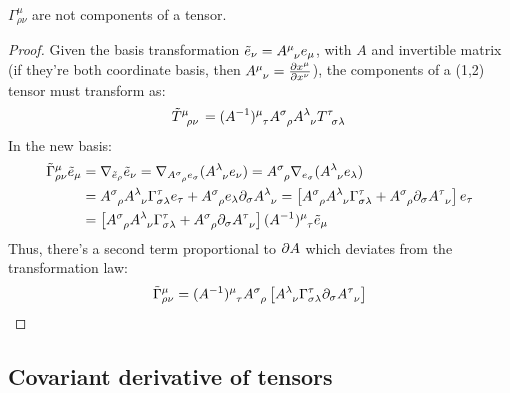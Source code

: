 \begin{proposition}
  $ \Gamma^\mu_{\rho \nu} $ are not components of a tensor.
\end{proposition}
\begin{proof}
  Given the basis transformation $ \tilde{e}_\nu = \tensor{A}{^\mu _\nu} e_\mu $, with $ A $ and invertible matrix (if they're both coordinate basis, then $ \tensor{A}{^\mu _\nu} = \frac{\pa x^\mu}{\pa x^\nu} $), the components of a (1,2) tensor must transform as:
  \begin{equation*}
    \tensor{\tilde{T}}{^\mu _\rho _\nu} = \tensor{(A^{-1})}{^\mu _\tau} \tensor{A}{^\sigma _\rho} \tensor{A}{^\lambda _\nu} \tensor{T}{^\tau _\sigma _\lambda}
  \end{equation*}
  In the new basis:
  \begin{equation*}
    \begin{split}
      \tilde{\Gamma}^\mu_{\rho \nu} \tilde{e}_\mu
      &= \na_{\tilde{e}_\rho}\tilde{e}_\nu = \na_{\tensor{A}{^\sigma _\rho} e_\sigma} (\tensor{A}{^\lambda _\nu} e_{\nu}) = \tensor{A}{^\sigma _\rho} \na_{e_\sigma} (\tensor{A}{^\lambda _\nu} e_\lambda) \\
      &= \tensor{A}{^\sigma _\rho} \tensor{A}{^\lambda _\nu} \Gamma^\tau_{\sigma \lambda} e_\tau + \tensor{A}{^\sigma _\rho} e_\lambda \pa_\sigma \tensor{A}{^\lambda _\nu} = \left[ \tensor{A}{^\sigma _\rho} \tensor{A}{^\lambda _\nu} \Gamma^\tau_{\sigma \lambda} + \tensor{A}{^\sigma _\rho} \pa_\sigma \tensor{A}{^\tau _\nu} \right] e_\tau \\
      &= \left[ \tensor{A}{^\sigma _\rho} \tensor{A}{^\lambda _\nu} \Gamma^\tau_{\sigma \lambda} + \tensor{A}{^\sigma _\rho} \pa_\sigma \tensor{A}{^\tau _\nu} \right] \tensor{(A^{-1})}{^\mu _\tau} \tilde{e}_\mu
    \end{split}
  \end{equation*}
  Thus, there's a second term proportional to $ \partial A $ which deviates from the transformation law:
  \begin{equation*}
    \tilde{\Gamma}^\mu_{\rho \nu} = \tensor{(A^{-1})}{^\mu _\tau} \tensor{A}{^\sigma _\rho} \left[ \tensor{A}{^\lambda _\nu} \Gamma^\tau_{\sigma \lambda} \pa_\sigma \tensor{A}{^\tau _\nu} \right]
  \end{equation*}
\end{proof}

\subsection{Covariant derivative of tensors}

